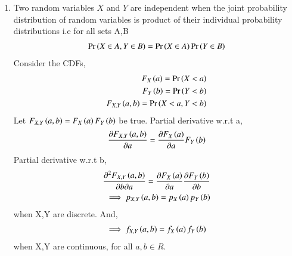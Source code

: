 \documentclass[journal,12pt,twocolumn]{IEEEtran}
\begin{document}
\begin{enumerate}
    \item Two random variables $X$ and $Y$ are independent when the joint probability distribution of random variables is product of their individual probability distributions i.e for all sets A,B
    \begin{align}
        \label{eq1} \Pr\left(X\in A,Y \in B\right)=\Pr\left(X \in A\right)\Pr\left(Y \in B\right)
    \end{align}
    Consider the CDFs,
    \begin{align}
        F_X\left(a\right)=\Pr\left(X<a\right)\\
        F_Y\left(b\right)=\Pr\left(Y<b\right)\\
        F_{X,Y}\left(a,b\right)=\Pr\left(X<a,Y<b\right)
    \end{align}
    Let $F_{X,Y}\left(a,b\right)=F_X\left(a\right)F_Y\left(b\right)$ be true. 
    Partial derivative w.r.t a,
    \begin{align}
        \frac{\partial F_{X,Y}\left(a,b\right)}{\partial a}=\frac{\partial F_X\left(a\right) }{\partial a}F_Y\left(b\right)
    \end{align}
    Partial derivative w.r.t b,
    \begin{align}
        \frac{\partial^2 F_{X,Y}\left(a,b\right)}{\partial b \partial a}=\frac{\partial F_X\left(a\right) }{\partial a}\frac{\partial F_Y\left(b\right) }{\partial b} \\
        \implies p_{X,Y}\left(a,b\right)=p_X\left(a\right)p_Y\left(b\right)
    \end{align}
    when X,Y are discrete. And,
    \begin{align}
        \implies f_{X,Y}\left(a,b\right)=f_X\left(a\right)f_Y\left(b\right)
    \end{align}
    when X,Y are continuous, for all $a,b\in R$. 
    

\end{enumerate}
\end{document}

